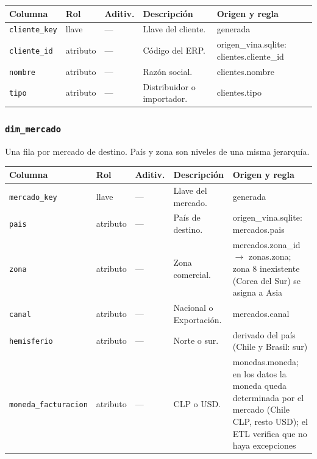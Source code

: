 {\footnotesize
\begin{longtable}{@{}>{\raggedright\arraybackslash}p{}>{\raggedright\arraybackslash}p{}>{\raggedright\arraybackslash}p{}>{\raggedright\arraybackslash}p{}>{\raggedright\arraybackslash}p{}@{}}
\toprule
Columna & Rol & Aditiv. & Descripción & Origen y regla \\
\midrule
\endhead
\texttt{cliente\_key} & llave & — & Llave del cliente. & generada \\
\texttt{cliente\_id} & atributo & — & Código del ERP. & origen\_vina.\allowbreak{}sqlite: clientes.\allowbreak{}cliente\_id \\
\texttt{nombre} & atributo & — & Razón social. & clientes.\allowbreak{}nombre \\
\texttt{tipo} & atributo & — & Distribuidor o importador. & clientes.\allowbreak{}tipo \\
\bottomrule
\end{longtable}
}

\subsubsection*{\texttt{dim\_mercado}}
Una fila por mercado de destino. País y zona son niveles de una misma jerarquía.

{\footnotesize
\begin{longtable}{@{}>{\raggedright\arraybackslash}p{}>{\raggedright\arraybackslash}p{}>{\raggedright\arraybackslash}p{}>{\raggedright\arraybackslash}p{}>{\raggedright\arraybackslash}p{}@{}}
\toprule
Columna & Rol & Aditiv. & Descripción & Origen y regla \\
\midrule
\endhead
\texttt{mercado\_key} & llave & — & Llave del mercado. & generada \\
\texttt{pais} & atributo & — & País de destino. & origen\_vina.\allowbreak{}sqlite: mercados.\allowbreak{}pais \\
\texttt{zona} & atributo & — & Zona comercial. & mercados.\allowbreak{}zona\_id $\rightarrow$ zonas.\allowbreak{}zona; zona 8 inexistente (Corea del Sur) se asigna a Asia \\
\texttt{canal} & atributo & — & Nacional o Exportación. & mercados.\allowbreak{}canal \\
\texttt{hemisferio} & atributo & — & Norte o sur. & derivado del país (Chile y Brasil: sur) \\
\texttt{moneda\_facturacion} & atributo & — & CLP o USD. & monedas.\allowbreak{}moneda; en los datos la moneda queda determinada por el mercado (Chile CLP, resto USD); el ETL verifica que no haya excepciones \\
\bottomrule
\end{longtable}
}
